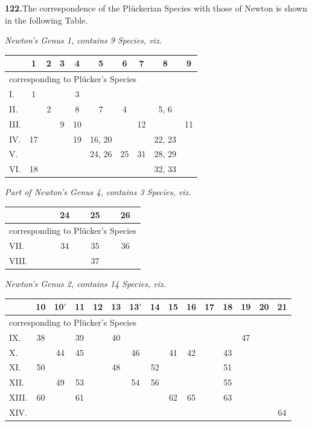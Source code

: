 \documentclass[11pt]{article}
\begin{document}
\medskip
\textbf{122.}\quad The correspondence of the Pl\"uckerian Species with those of Newton is shown in the following Table.

\medskip
\noindent\emph{Newton's Genus 1, contains 9 Species, viz.}
\begin{center}\small
\begin{tabular}{|l|c|c|c|c|c|c|c|c|c|}\hline
& 1 & 2 & 3 & 4 & 5 & 6 & 7 & 8 & 9\\\hline
\multicolumn{10}{|l|}{\quad corresponding to Pl\"ucker's Species}\\\hline
I.   & 1  &    &    & 3  &    &    &    &    &    \\\hline
II.  &    & 2  &    & 8  & 7  & 4  &    & 5, 6 &    \\\hline
III. &    &    & 9  & 10 &    &    & 12 &    & 11 \\\hline
IV.  & 17 &    &    & 19 & 16, 20 &    &    & 22, 23 &    \\\hline
V.   &    &    &    &    & 24, 26 & 25 & 31 & 28, 29 &    \\\hline
VI.  & 18 &    &    &    &        &    &    & 32, 33 &    \\\hline
\end{tabular}
\end{center}

\medskip
\noindent\emph{Part of Newton's Genus 4, contains 3 Species, viz.}
\begin{center}\small
\begin{tabular}{|l|c|c|c|}\hline
& 24 & 25 & 26 \\\hline
\multicolumn{4}{|l|}{\quad corresponding to Pl\"ucker's Species}\\\hline
VII.  & 34 & 35 & 36 \\\hline
VIII. &    & 37 &    \\\hline
\end{tabular}
\end{center}

\medskip
\noindent\emph{Newton's Genus 2, contains 14 Species, viz.}
\begin{center}\footnotesize
\begin{tabular}{|l|c|c|c|c|c|c|c|c|c|c|c|c|c|c|}\hline
& 10 & 10$'$ & 11 & 12 & 13 & 13$'$ & 14 & 15 & 16 & 17 & 18 & 19 & 20 & 21 \\\hline
\multicolumn{15}{|l|}{\quad corresponding to Pl\"ucker's Species}\\\hline
IX.   & 38 &    & 39 &    & 40 &    &    &    &    &    &    & 47 &    &    \\\hline
X.    &    & 44 & 45 &    &    & 46 &    & 41 & 42 &    & 43 &    &    &    \\\hline
XI.   & 50 &    &    &    & 48 &    & 52 &    &    &    & 51 &    &    &    \\\hline
XII.  &    & 49 & 53 &    &    & 54 & 56 &    &    &    & 55 &    &    &    \\\hline
XIII. & 60 &    & 61 &    &    &    &    & 62 & 65 &    & 63 &    &    &    \\\hline
XIV.  &    &    &    &    &    &    &    &    &    &    &    &    &    & 64 \\\hline
\end{tabular}
\end{center}
\end{document}
